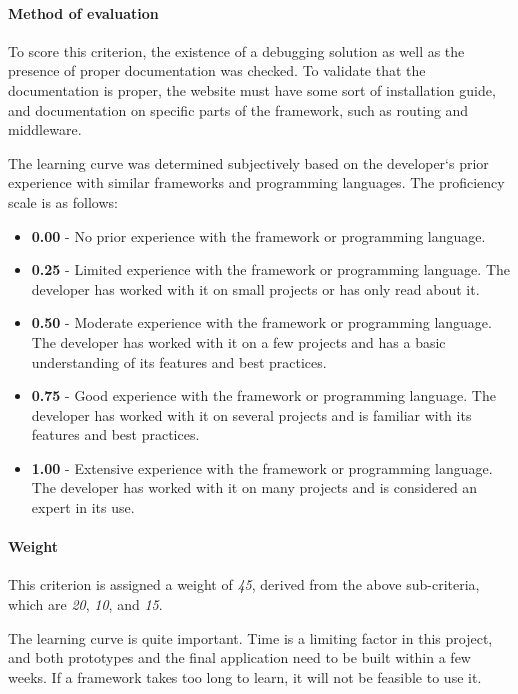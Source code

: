 \paragraph{Method of evaluation}
To score this criterion, the existence of a debugging solution as well as the presence of proper documentation was checked.
To validate that the documentation is proper, the website must have some sort of installation guide, and documentation on specific parts of the framework, such as routing and middleware.

The learning curve was determined subjectively based on the developer`s prior experience with similar frameworks and programming languages.
The proficiency scale is as follows:

\begin{itemize}
	\item \textbf{0.00} - No prior experience with the framework or programming language.
	\item \textbf{0.25} - Limited experience with the framework or programming language.
	      The developer has worked with it on small projects or has only read about it.
	\item \textbf{0.50} - Moderate experience with the framework or programming language.
	      The developer has worked with it on a few projects and has a basic understanding of its features and best practices.
	\item \textbf{0.75} - Good experience with the framework or programming language.
	      The developer has worked with it on several projects and is familiar with its features and best practices.
	\item \textbf{1.00} - Extensive experience with the framework or programming language.
	      The developer has worked with it on many projects and is considered an expert in its use.
\end{itemize}

\paragraph{Weight}
This criterion is assigned a weight of \emph{45}, derived from the above sub-criteria, which are \emph{20}, \emph{10}, and \emph{15}.

The learning curve is quite important.
Time is a limiting factor in this project, and both prototypes and the final application need to be built within a few weeks.
If a framework takes too long to learn, it will not be feasible to use it.

